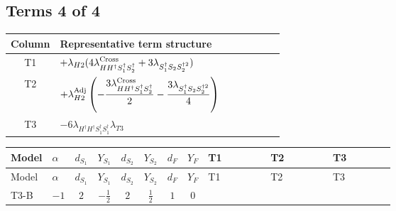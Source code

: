 \documentclass[8pt]{article}
\begin{document}
\begin{landscape}
\subsection*{Terms 4 of 4}
\begin{center}
\begin{tabular}{@{}c >{\raggedright\arraybackslash}p{0.82\linewidth}@{}}
\toprule
Column & Representative term structure \\
\midrule
T1 & \(\displaystyle +{\lambda_{H2}} (4 {\lambda_{H H^\dagger S_1^\dagger S_2^\dagger}^{\rm Cross}}+3 {\lambda_{S_1^\dagger S_2 S_2^{\dagger 2}}})\) \\
\midrule
T2 & \(\displaystyle +{\lambda_{H2}^{\rm Adj}} \left(-\frac{3 {\lambda_{H H^\dagger S_1^\dagger S_2^\dagger}^{\rm Cross}}}{2}-\frac{3 {\lambda_{S_1^\dagger S_2 S_2^{\dagger 2}}}}{4}\right)\) \\
\midrule
T3 & \(\displaystyle -6 {\lambda_{H^\dagger H^\dagger S_1^\dagger S_1^\dagger}} {\lambda_{T3}}\) \\
\midrule
\bottomrule
\end{tabular}
\end{center}
\smallskip
\tiny
\begin{longtable}{@{}llcccccc >{\raggedright\arraybackslash}p{0.21\linewidth} >{\raggedright\arraybackslash}p{0.21\linewidth} >{\raggedright\arraybackslash}p{0.21\linewidth}@{}}
\toprule
Model & $\alpha$ & $d_{S_1}$ & $Y_{S_1}$ & $d_{S_2}$ & $Y_{S_2}$ & $d_F$ & $Y_F$ & T1 & T2 & T3 \\
\midrule
\endfirsthead
\toprule
Model & $\alpha$ & $d_{S_1}$ & $Y_{S_1}$ & $d_{S_2}$ & $Y_{S_2}$ & $d_F$ & $Y_F$ & T1 & T2 & T3 \\
\midrule
\endhead
T3-B & $-1$ & $2$ & $-\frac{1}{2}$ & $2$ & $\frac{1}{2}$ & $1$ & $0$ & \scriptsize\adjustbox{max width=\linewidth}{$\begin{gathered} +{\lambda_{H2}} (4 {\lambda_{H H^\dagger S_1^\dagger S_2^\dagger}^{\rm Cross}}+3 {\lambda_{S_1^\dagger S_2 S_2^{\dagger 2}}})\end{gathered}$} & \scriptsize\adjustbox{max width=\linewidth}{$\begin{gathered} +{\lambda_{H2}^{\rm Adj}} \left(-\frac{3 {\lambda_{H H^\dagger S_1^\dagger S_2^\dagger}^{\rm Cross}}}{2}-\frac{3 {\lambda_{S_1^\dagger S_2 S_2^{\dagger 2}}}}{4}\right)\end{gathered}$} & \scriptsize\adjustbox{max width=\linewidth}{$\begin{gathered} -6 {\lambda_{H^\dagger H^\dagger S_1^\dagger S_1^\dagger}} {\lambda_{T3}}\end{gathered}$} \\

\end{longtable}
\end{landscape}
\end{document}
